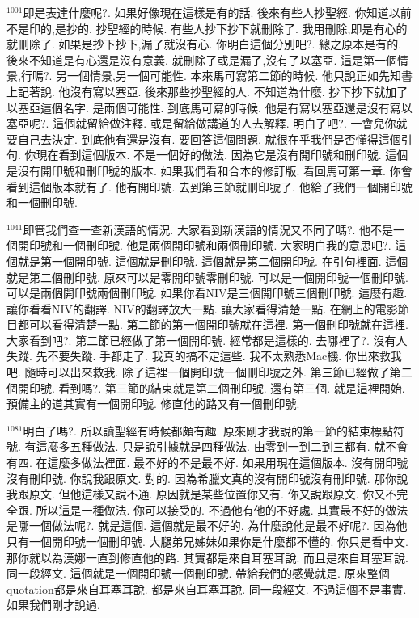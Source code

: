 \documentclass{book}
\begin{document}
$^{1001}$即是表達什麼呢?.
如果好像現在這樣是有的話.
後來有些人抄聖經.
你知道以前不是印的,是抄的.
抄聖經的時候.
有些人抄下抄下就刪除了.
我用刪除,即是有心的就刪除了.
如果是抄下抄下,漏了就沒有心.
你明白這個分別吧?.
總之原本是有的.
後來不知道是有心還是沒有意義.
就刪除了或是漏了,沒有了以塞亞.
這是第一個情景,行嗎?.
另一個情景,另一個可能性.
本來馬可寫第二節的時候.
他只說正如先知書上記著說.
他沒有寫以塞亞.
後來那些抄聖經的人.
不知道為什麼.
抄下抄下就加了以塞亞這個名字.
是兩個可能性.
到底馬可寫的時候.
他是有寫以塞亞還是沒有寫以塞亞呢?.
這個就留給做注釋.
或是留給做講道的人去解釋.
明白了吧?.
一會兒你就要自己去決定.
到底他有還是沒有.
要回答這個問題.
就很在乎我們是否懂得這個引句.
你現在看到這個版本.
不是一個好的做法.
因為它是沒有開印號和刪印號.
這個是沒有開印號和刪印號的版本.
如果我們看和合本的修訂版.
看回馬可第一章.
你會看到這個版本就有了.
他有開印號.
去到第三節就刪印號了.
他給了我們一個開印號和一個刪印號.

$^{1041}$即管我們查一查新漢語的情況.
大家看到新漢語的情況又不同了嗎?.
他不是一個開印號和一個刪印號.
他是兩個開印號和兩個刪印號.
大家明白我的意思吧?.
這個就是第一個開印號.
這個就是刪印號.
這個就是第二個開印號.
在引句裡面.
這個就是第二個刪印號.
原來可以是零開印號零刪印號.
可以是一個開印號一個刪印號.
可以是兩個開印號兩個刪印號.
如果你看NIV是三個開印號三個刪印號.
這麼有趣.
讓你看看NIV的翻譯.
NIV的翻譯放大一點.
讓大家看得清楚一點.
在網上的電影節目都可以看得清楚一點.
第二節的第一個開印號就在這裡.
第一個刪印號就在這裡.
大家看到吧?.
第二節已經做了第一個開印號.
經常都是這樣的.
去哪裡了?.
沒有人失蹤.
先不要失蹤.
手都走了.
我真的搞不定這些.
我不太熟悉Mac機.
你出來救我吧.
隨時可以出來救我.
除了這裡一個開印號一個刪印號之外.
第三節已經做了第二個開印號.
看到嗎?.
第三節的結束就是第二個刪印號.
還有第三個.
就是這裡開始.
預備主的道其實有一個開印號.
修直他的路又有一個刪印號.

$^{1081}$明白了嗎?.
所以讀聖經有時候都頗有趣.
原來剛才我說的第一節的結束標點符號.
有這麼多五種做法.
只是說引據就是四種做法.
由零到一到二到三都有.
就不會有四.
在這麼多做法裡面.
最不好的不是最不好.
如果用現在這個版本.
沒有開印號沒有刪印號.
你說我跟原文.
對的.
因為希臘文真的沒有開印號沒有刪印號.
那你說我跟原文.
但他這樣又說不通.
原因就是某些位置你又有.
你又說跟原文.
你又不完全跟.
所以這是一種做法.
你可以接受的.
不過他有他的不好處.
其實最不好的做法是哪一個做法呢?.
就是這個.
這個就是最不好的.
為什麼說他是最不好呢?.
因為他只有一個開印號一個刪印號.
大腿弟兄姊妹如果你是什麼都不懂的.
你只是看中文.
那你就以為漢娜一直到修直他的路.
其實都是來自耳塞耳說.
而且是來自耳塞耳說.
同一段經文.
這個就是一個開印號一個刪印號.
帶給我們的感覺就是.
原來整個quotation都是來自耳塞耳說.
都是來自耳塞耳說.
同一段經文.
不過這個不是事實.
如果我們剛才說過.
\end{document}
